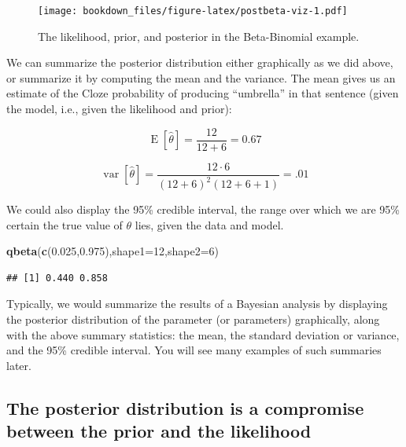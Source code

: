 \documentclass[12pt,]{krantz}
\newenvironment{Shaded}{\begin{snugshade}}{\end{snugshade}}
\newcommand{\KeywordTok}[1]{\textcolor[rgb]{0.13,0.29,0.53}{\textbf{#1}}}
\newcommand{\DataTypeTok}[1]{\textcolor[rgb]{0.13,0.29,0.53}{#1}}
\newcommand{\DecValTok}[1]{\textcolor[rgb]{0.00,0.00,0.81}{#1}}
\newcommand{\FloatTok}[1]{\textcolor[rgb]{0.00,0.00,0.81}{#1}}
\newcommand{\NormalTok}[1]{#1}
\theoremstyle{definition}
\theoremstyle{definition}
\theoremstyle{definition}
\theoremstyle{remark}
\begin{document}
\begin{figure}
\centering
\texttt{[image: bookdown\_files/figure-latex/postbeta-viz-1.pdf]}
\caption{\label{fig:postbeta-viz}The likelihood, prior, and posterior in the
Beta-Binomial example.}
\end{figure}

We can summarize the posterior distribution either graphically as we did
above, or summarize it by computing the mean and the variance. The mean
gives us an estimate of the Cloze probability of producing ``umbrella''
in that sentence (given the model, i.e., given the likelihood and
prior):

\begin{equation}
\operatorname{E}[\hat\theta] = \frac{12}{12+6}=0.67
\label{eq:meanPb}
\end{equation}

\begin{equation}
\operatorname{var}[\hat\theta]=\frac {12 \cdot 6 }{(12 + 6 )^{2}(12 + 6 +1)}= .01
\label{eq:varPb}
\end{equation}

We could also display the 95\% credible interval, the range over which
we are 95\% certain the true value of \(\theta\) lies, given the data
and model.

\begin{Shaded}
\begin{Highlighting}[]
\KeywordTok{qbeta}\NormalTok{(}\KeywordTok{c}\NormalTok{(}\FloatTok{0.025}\NormalTok{,}\FloatTok{0.975}\NormalTok{),}\DataTypeTok{shape1=}\DecValTok{12}\NormalTok{,}\DataTypeTok{shape2=}\DecValTok{6}\NormalTok{)}
\end{Highlighting}
\end{Shaded}

\begin{verbatim}
## [1] 0.440 0.858
\end{verbatim}

Typically, we would summarize the results of a Bayesian analysis by
displaying the posterior distribution of the parameter (or parameters)
graphically, along with the above summary statistics: the mean, the
standard deviation or variance, and the 95\% credible interval. You will
see many examples of such summaries later.

\subsection{The posterior distribution is a compromise between the prior
and the
likelihood}\label{the-posterior-distribution-is-a-compromise-between-the-prior-and-the-likelihood}
\end{document}
